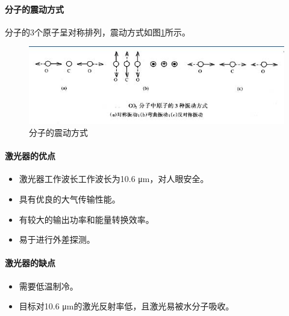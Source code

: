 \paragraph{分子的震动方式}分子的3个原子呈对称排列，震动方式如图\ref{fig:CO2分子的震动方式}所示。
\begin{figure}[htbp]
	\centering
	\includegraphics[width=\linewidth]{figure/Chapter2/CO2分子的震动方式}
	\caption{分子的震动方式}
	\label{fig:CO2分子的震动方式}
\end{figure}

\paragraph{激光器的优点}\begin{itemize}
	\item {}激光器工作波长工作波长为10.6 μm，对人眼安全。
	\item 具有优良的大气传输性能。
	\item 有较大的输出功率和能量转换效率。
	\item 易于进行外差探测。
\end{itemize}

\paragraph{激光器的缺点}\begin{itemize}
	\item 需要低温制冷。
	\item 目标对10.6 μm的激光反射率低，且激光易被水分子吸收。
\end{itemize}

